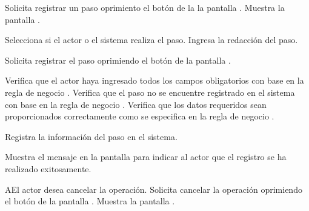  \begin{UCtrayectoria}
	\UCpaso[\UCactor] Solicita registrar un paso oprimiento el botón  de la la pantalla . 
	\UCpaso[\UCsist] Muestra la pantalla . 
	
	\UCpaso[\UCactor] Selecciona si el actor o el sistema realiza el paso.\label{cu5.1.1.1.1:ingresaDatos}
	\UCpaso[\UCactor] Ingresa la redacción del paso.
	
	\UCpaso[\UCactor] Solicita registrar el paso oprimiendo el botón  de la pantalla .  
	
	\UCpaso[\UCsist] Verifica que el actor haya ingresado todos los campos obligatorios con base en la regla de negocio . 
	\UCpaso[\UCsist] Verifica que el paso no se encuentre registrado en el sistema con base en la regla de negocio . 
	\UCpaso[\UCsist] Verifica que los datos requeridos sean proporcionados correctamente como se especifica en la regla de negocio .  
	
	\UCpaso[\UCsist] Registra la información del paso en el sistema.
	
	\UCpaso[\UCsist] Muestra el mensaje  en la pantalla  
	para indicar al actor que el registro se ha realizado exitosamente.
    
\end{UCtrayectoria}

    
 \begin{UCtrayectoriaA}{A}{El actor desea cancelar la operación.}
    \UCpaso[\UCactor] Solicita cancelar la operación oprimiendo el botón  de la pantalla .
    \UCpaso[\UCsist] Muestra la pantalla .
 \end{UCtrayectoriaA}
 

